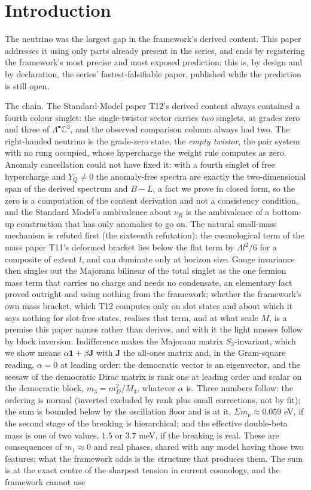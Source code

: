 \documentclass[11pt]{article}
\theoremstyle{definition}
\newcommand{\C}{\mathbb{C}}
\newcommand{\mnu}{\Sigma m_{\nu}}
\newcommand{\J}{\mathbf{J}}
\begin{document}
\newpage
\section{Introduction}\label{sec:intro}

The neutrino was the largest gap in the framework's derived content. This paper addresses it using only parts already present in the series, and ends by registering the framework's most precise and most exposed prediction: this is, by design and by declaration, the series' fastest-falsifiable paper, published while the prediction is still open.

The chain. The Standard-Model paper T12's derived content always contained a fourth colour singlet: the single-twistor sector carries \emph{two} singlets, at grades zero and three of $\Lambda^{\bullet}\C^{3}$, and the observed comparison column always had two. The right-handed neutrino is the grade-zero state, the \emph{empty twistor}, the pair system with no rung occupied, whose hypercharge the weight rule computes as zero. Anomaly cancellation could not have fixed it: with a fourth singlet of free hypercharge and $Y_{Q} \neq 0$ the anomaly-free spectra are exactly the two-dimensional span of the derived spectrum and $B - L$, a fact we prove in closed form, so the zero is a computation of the content derivation and not a consistency condition, and the Standard Model's ambivalence about $\nu_{R}$ is the ambivalence of a bottom-up construction that has only anomalies to go on. The natural small-mass mechanism is refuted first (the sixteenth refutation): the cosmological term of the mass paper T11's deformed bracket lies below the flat term by $\Lambda l^{2}/6$ for a composite of extent $l$, and can dominate only at horizon size. Gauge invariance then singles out the Majorana bilinear of the total singlet as the one fermion mass term that carries no charge and needs no condensate, an elementary fact proved outright and using nothing from the framework; whether the framework's own mass bracket, which T12 computes only on slot states and about which it says nothing for slot-free states, realises that term, and at what scale $M$, is a premise this paper names rather than derives, and with it the light masses follow by block inversion. Indifference makes the Majorana matrix $S_{3}$-invariant, which we show means $\alpha\mathbf{1} + \beta\J$ with $\J$ the all-ones matrix and, in the Gram-square reading, $\alpha = 0$ at leading order: the democratic vector is an eigenvector, and the seesaw of the democratic Dirac matrix is rank one at leading order and scalar on the democratic block, $m_{3} = m_{D}^{2}/M_{3}$, whatever $\alpha$ is. Three numbers follow: the ordering is normal (inverted excluded by rank plus small corrections, not by fit); the sum is bounded below by the oscillation floor and is at it, $\mnu \approx 0.059$ eV, if the second stage of the breaking is hierarchical; and the effective double-beta mass is one of two values, $1.5$ or $3.7$ meV, if the breaking is real. These are consequences of $m_{1} \approx 0$ and real phases, shared with any model having those two features; what the framework adds is the structure that produces them. The sum is at the exact centre of the sharpest tension in current cosmology, and the framework cannot use 
\end{document}
